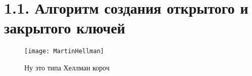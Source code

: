 
\section*{1.1. Алгоритм создания открытого и закрытого ключей }

\begin{figure}[h]	
\begin{center}
		\texttt{[image: MartinHellman]}
		\caption{Ну это типа Хеллман короч}
\end{center}
\end{figure}